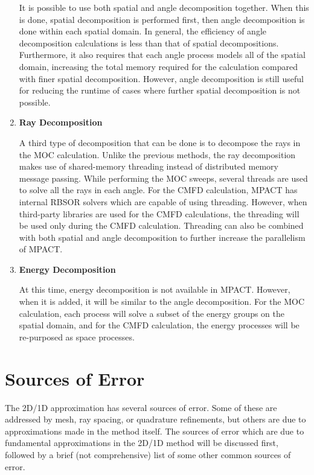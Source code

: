 \begin{enumerate}[leftmargin=*]
It is possible to use both spatial and angle decomposition together.  When this is done, spatial decomposition is performed first, then angle decomposition is done within each spatial domain.  In general, the efficiency of angle decomposition calculations is less than that of spatial decompositions.  Furthermore, it also requires that each angle process models all of the spatial domain, increasing the total memory required for the calculation compared with finer spatial decomposition.  However, angle decomposition is still useful for reducing the runtime of cases where further spatial decomposition is not possible.

\item \textbf{Ray Decomposition}

A third type of decomposition that can be done is to decompose the rays in the MOC calculation.  Unlike the previous methods, the ray decomposition makes use of shared-memory threading instead of distributed memory message passing.  While performing the MOC sweeps, several threads are used to solve all the rays in each angle.  For the CMFD calculation, MPACT has internal RBSOR solvers which are capable of using threading.  However, when third-party libraries are used for the CMFD calculations, the threading will be used only during the CMFD calculation.  Threading can also be combined with both spatial and angle decomposition to further increase the parallelism of MPACT.

\item \textbf{Energy Decomposition}

At this time, energy decomposition is not available in MPACT.  However, when it is added, it will be similar to the angle decomposition.  For the MOC calculation, each process will solve a subset of the energy groups on the spatial domain, and for the CMFD calculation, the energy processes will be re-purposed as space processes.
\end{enumerate}

\section{Sources of Error}\label{s:2d1dErrors}

The 2D/1D approximation has several sources of error.  Some of these are addressed by mesh, ray spacing, or quadrature refinements, but others are due to approximations made in the method itself.  The sources of error which are due to fundamental approximations in the 2D/1D method will be discussed first, followed by a brief (not comprehensive) list of some other common sources of error.

